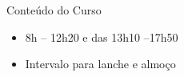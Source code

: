 \begin{frame}[t, fragile]{Conteúdo do Curso}
  \begin{itemize}
    \item 8h -- 12h20 e das 13h10 --17h50
    \item Intervalo para lanche e almoço
  \end{itemize}
\end{frame}